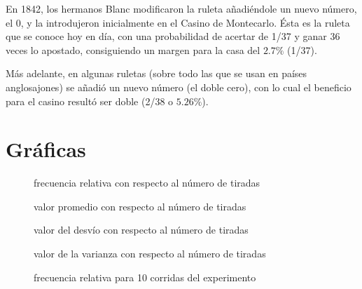 \documentclass{article}
\begin{document}
En 1842, los hermanos Blanc modificaron la ruleta añadiéndole un nuevo número, el 0, y la introdujeron inicialmente en el Casino de Montecarlo. Ésta es la ruleta que se conoce hoy en día, con una probabilidad de acertar de 1/37 y ganar 36 veces lo apostado, consiguiendo un margen para la casa del $2.7\%$ (1/37).

Más adelante, en algunas ruletas (sobre todo las que se usan en países anglosajones) se añadió un nuevo número (el doble cero), con lo cual el beneficio para el casino resultó ser doble (2/38 o $5.26\%$).

\section{Gráficas}
\begin{figure}[!htbp]
  \begin{mytikzresize}{0.6\textwidth}
    \centering
    
    \caption{frecuencia relativa con respecto al número de tiradas}
  \end{mytikzresize}
\end{figure}

\begin{figure}[!htbp]
  \begin{mytikzresize}{0.6\textwidth}
    \centering
    
    \caption{valor promedio con respecto al número de tiradas}
  \end{mytikzresize}
\end{figure}

\begin{figure}[!htbp]
  \begin{mytikzresize}{0.6\textwidth}
    \centering
    
    \caption{valor del desvío con respecto al número de tiradas}
  \end{mytikzresize}
\end{figure}

\begin{figure}[!htbp]
  \begin{mytikzresize}{0.6\textwidth}
    \centering
    
    \caption{valor de la varianza con respecto al número de tiradas}
  \end{mytikzresize}
\end{figure}

\begin{figure}[!htbp]
  \begin{mytikzresize}{0.6\textwidth}
    \centering
    
    \caption{frecuencia relativa para 10 corridas del experimento}
  \end{mytikzresize}
\end{figure}
\end{document}
